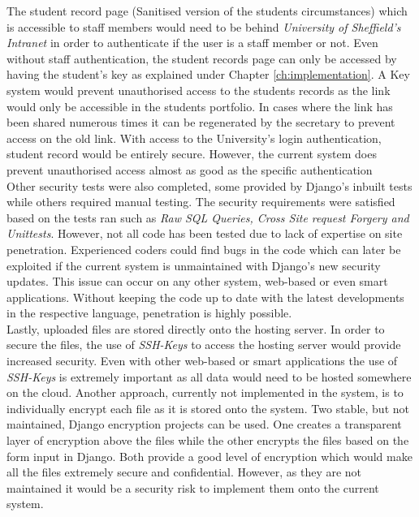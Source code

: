 \documentclass[../main.tex]{subfiles}
\begin{document}
The student record page (Sanitised version of the students circumstances) which is accessible to staff members would need to be behind \textit{University of Sheffield's Intranet} in order to authenticate if the user is a staff member or not. Even without staff authentication, the student records page can only be accessed by having the student's key as explained under Chapter \ref{ch:implementation}. A Key system would prevent unauthorised access to the students records as the link would only be accessible in the students portfolio. In cases where the link has been shared numerous times it can be regenerated by the secretary to prevent access on the old link. With access to the University's login authentication, student record would be entirely secure. However, the current system does prevent unauthorised access almost as good as the specific authentication\\[4mm]

Other security tests were also completed, some provided by Django's inbuilt tests while others required manual testing. The security requirements were satisfied based on the tests ran such as \textit{Raw SQL Queries, Cross Site request Forgery and Unittests}. However, not all code has been tested due to lack of expertise on site penetration. Experienced coders could find bugs in the code which can later be exploited if the current system is unmaintained with Django's new security updates. This issue can occur on any other system, web-based or even smart applications. Without keeping the code up to date with the latest developments in the respective language, penetration is highly possible.   \\[4mm]

Lastly, uploaded files are stored directly onto the hosting server. In order to secure the files, the use of \textit{SSH-Keys} to access the hosting server would provide increased security. Even with other web-based or smart applications the use of \textit{SSH-Keys} is extremely important as all data would need to be hosted somewhere on the cloud. Another approach, currently not implemented in the system, is to individually encrypt each file as it is stored onto the system. Two stable, but not maintained, Django encryption projects can be used. One creates a transparent layer of encryption above the files\cite{danielquinn} while the other encrypts the files based on the form input in Django\cite{ruddra}. Both provide a good level of encryption which would make all the files extremely secure and confidential. However, as they are not maintained it would be a security risk to implement them onto the current system. 
\end{document}
